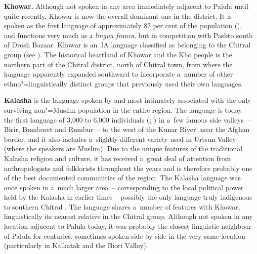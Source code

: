 \textbf{Khowar.} Although not spoken in any area immediately adjacent to Palula until quite recently, Khowar is now the overall dominant one in the district. It is spoken as the first language of approximately 82 per cent of the population (\citealt[11]{decker1992a}), and functions very much as a \textit{lingua franca}, but in competition with Pashto south of Drosh Bazaar. Khowar is an~IA language classified as belonging to the Chitral group (see ). The historical heartland of Khowar and the Kho people is the northern part of the Chitral district, north of Chitral town, from where the language apparently expanded southward to incorporate a~number of other ethno"=linguistically distinct groups that previously used their own languages.


\textbf{Kalasha} is the language spoken by and most intimately associated with the only surviving non"=Muslim population in the entire region. The language is today the first language of 3,000 to 6,000 individuals (\citealt[xi]{trailcooper1999}; \citealt[8]{heegardpetersen2006}) in a~few famous side valleys~-- Birir, Bumboret and Rumbur~-- to the west of the Kunar River, near the Afghan border, and it also includes a~slightly different variety used in Urtsun Valley (where the speakers are Muslim). Due to the unique features of the traditional Kalasha religion and culture, it has received a~great deal of attention from anthropologists and folklorists throughout the years and is therefore probably one of the best documented communities of the region. The Kalasha language was once spoken in a~much larger area~-- corresponding to the local political power held by the Kalasha in earlier times \citep[33]{siiger1956} -- possibly the only language truly indigenous to southern Chitral \citep{strand2001}. The language shares a~number of features with Khowar, linguistically its nearest relative in the Chitral group. Although not spoken in any location adjacent to Palula today, it was probably the closest linguistic neighbour of Palula for centuries, sometimes spoken side by side in the very same location (particularly in Kalkatak and the Biori Valley).



